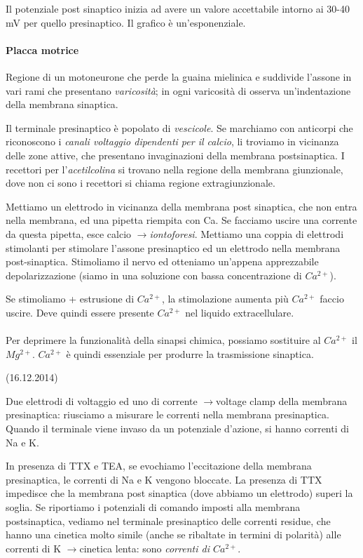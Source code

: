 \documentclass[a4paper,12pt]{article}
\newcommand{\lfreccia}{\ensuremath{\longrightarrow}}
\begin{document}
Il potenziale post sinaptico inizia ad avere un valore accettabile intorno ai 30-40 mV per quello presinaptico. Il grafico è un'esponenziale.

\paragraph{Placca motrice}
Regione di un motoneurone che perde la guaina mielinica e suddivide l'assone in vari rami che presentano \emph{varicosità}; in ogni varicosità di osserva un'indentazione della membrana sinaptica. 

Il terminale presinaptico è popolato di \emph{vescicole}. Se marchiamo con anticorpi che riconoscono i \emph{canali voltaggio dipendenti per il calcio}, li troviamo in vicinanza delle zone attive, che presentano invaginazioni della membrana postsinaptica. I recettori per l'\emph{acetilcolina} si trovano nella regione della membrana giunzionale, dove non ci sono i recettori si chiama regione extragiunzionale.

Mettiamo un elettrodo in vicinanza della membrana post sinaptica, che non entra nella membrana, ed una pipetta riempita con Ca. Se facciamo uscire una corrente da questa pipetta, esce calcio \lfreccia \emph{iontoforesi}. Mettiamo una coppia di elettrodi stimolanti per stimolare l'assone presinaptico ed un elettrodo nella membrana post-sinaptica. Stimoliamo il nervo ed otteniamo un'appena apprezzabile depolarizzazione (siamo in una soluzione con bassa concentrazione di $Ca^{2+}$).

Se stimoliamo + estrusione di $Ca^{2+}$, la stimolazione aumenta più $Ca^{2+}$ faccio uscire. Deve quindi essere presente $Ca^{2+}$ nel liquido extracellulare.


\paragraph{}
Per deprimere la funzionalità della sinapsi chimica, possiamo sostituire al $Ca^{2+}$ il $Mg^{2+}$. $Ca^{2+}$ è quindi essenziale per produrre la trasmissione sinaptica.

(16.12.2014)

Due elettrodi di voltaggio ed uno di corrente \lfreccia voltage clamp della membrana presinaptica: riusciamo a misurare le correnti nella membrana presinaptica. Quando il terminale viene invaso da un potenziale d'azione, si hanno correnti di Na e K.

In presenza di TTX e TEA, se evochiamo l'eccitazione della membrana presinaptica, le correnti di Na e K vengono bloccate. La presenza di TTX impedisce che la membrana post sinaptica (dove abbiamo un elettrodo) superi la soglia. Se riportiamo i potenziali di comando imposti alla membrana postsinaptica, vediamo nel terminale presinaptico delle correnti residue, che hanno una cinetica molto simile (anche se ribaltate in termini di polarità) alle correnti di K \lfreccia cinetica lenta: sono \emph{correnti di $Ca^{2+}$}.
\end{document}
